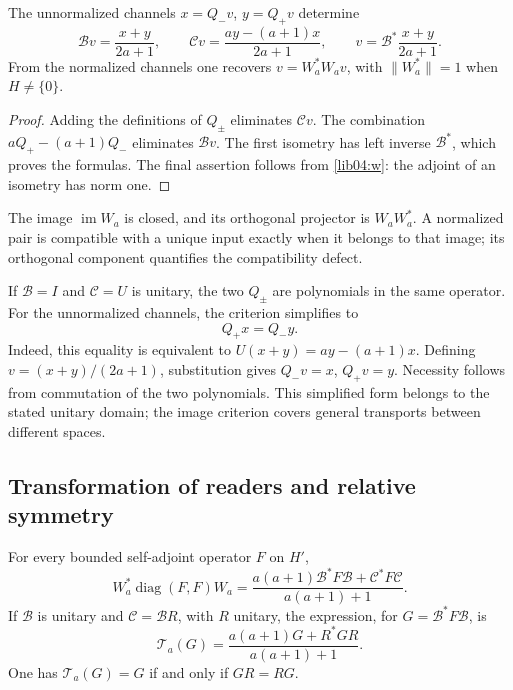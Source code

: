 \begin{proposition}
\label{lib04:prop-recuperacion}
The unnormalized channels \(x=Q_-v\), \(y=Q_+v\) determine
\begin{equation}
 \mathcal Bv=\frac{x+y}{2a+1},\qquad
 \mathcal Cv=\frac{ay-(a+1)x}{2a+1},\qquad
 v=\mathcal B^*\frac{x+y}{2a+1}.
 \label{lib04:inversa-canales}
\end{equation}
From the normalized channels one recovers
\(v=W_a^*W_av\), with \(\|W_a^*\|=1\) when \(H\neq\{0\}\).
\end{proposition}

\begin{proof}
Adding the definitions of \(Q_\pm\) eliminates \(\mathcal Cv\).
The combination \(aQ_+-(a+1)Q_-\) eliminates \(\mathcal Bv\).
The first isometry has left inverse \(\mathcal B^*\), which
proves the formulas. The final assertion follows from
\eqref{lib04:w}: the adjoint of an isometry has norm one.
\end{proof}

The image \(\operatorname{im}W_a\) is closed, and its orthogonal
projector is \(W_aW_a^*\). A normalized pair is compatible with a
unique input exactly when it belongs to that image; its orthogonal
component quantifies the compatibility defect.

If \(\mathcal B=I\) and \(\mathcal C=U\) is unitary, the two
\(Q_\pm\) are polynomials in the same operator. For the unnormalized
channels, the criterion simplifies to
\begin{equation}
 Q_+x=Q_-y.
 \label{lib04:compatibilidad-unitaria}
\end{equation}
Indeed, this equality is equivalent to
\(U(x+y)=ay-(a+1)x\). Defining
\(v=(x+y)/(2a+1)\), substitution gives
\(Q_-v=x\), \(Q_+v=y\). Necessity follows from commutation
of the two polynomials. This simplified form belongs to the stated
unitary domain; the image criterion covers general transports
between different spaces.

\subsection{Transformation of readers and relative symmetry}
\label{lib04:lectores}

\begin{theorem}
\label{lib04:teo-lector}
For every bounded self-adjoint operator \(F\) on \(H'\),
\begin{equation}
 W_a^*\operatorname{diag}(F,F)W_a
 =\frac{a(a+1)\mathcal B^*F\mathcal B+
                  \mathcal C^*F\mathcal C}{a(a+1)+1}.
 \label{lib04:lector-general}
\end{equation}
If \(\mathcal B\) is unitary and \(\mathcal C=\mathcal BR\), with
\(R\) unitary, the expression, for \(G=\mathcal B^*F\mathcal B\),
is
\begin{equation}
 \mathcal T_a(G)=\frac{a(a+1)G+R^*GR}{a(a+1)+1}.
 \label{lib04:lector-relativo}
\end{equation}
One has \(\mathcal T_a(G)=G\) if and only if \(GR=RG\).
\end{theorem}


